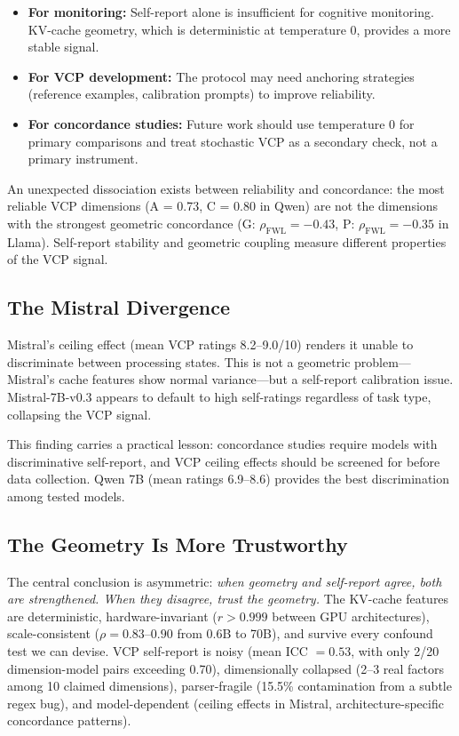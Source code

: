 \documentclass[11pt,a4paper]{article}
\begin{document}
\begin{itemize}
    \item \textbf{For monitoring:} Self-report alone is insufficient for cognitive monitoring. KV-cache geometry, which is deterministic at temperature 0, provides a more stable signal.
    \item \textbf{For VCP development:} The protocol may need anchoring strategies (reference examples, calibration prompts) to improve reliability.
    \item \textbf{For concordance studies:} Future work should use temperature 0 for primary comparisons and treat stochastic VCP as a secondary check, not a primary instrument.
\end{itemize}

An unexpected dissociation exists between reliability and concordance: the most reliable VCP dimensions (A = 0.73, C = 0.80 in Qwen) are not the dimensions with the strongest geometric concordance (G: $\rho_{\text{FWL}} = -0.43$, P: $\rho_{\text{FWL}} = -0.35$ in Llama). Self-report stability and geometric coupling measure different properties of the VCP signal.

\subsection{The Mistral Divergence}

Mistral's ceiling effect (mean VCP ratings 8.2--9.0/10) renders it unable to discriminate between processing states. This is not a geometric problem---Mistral's cache features show normal variance---but a self-report calibration issue. Mistral-7B-v0.3 appears to default to high self-ratings regardless of task type, collapsing the VCP signal.

This finding carries a practical lesson: concordance studies require models with discriminative self-report, and VCP ceiling effects should be screened for before data collection. Qwen 7B (mean ratings 6.9--8.6) provides the best discrimination among tested models.

\subsection{The Geometry Is More Trustworthy}

The central conclusion is asymmetric: \emph{when geometry and self-report agree, both are strengthened. When they disagree, trust the geometry.} The KV-cache features are deterministic, hardware-invariant ($r > 0.999$ between GPU architectures), scale-consistent ($\rho = 0.83$--$0.90$ from 0.6B to 70B), and survive every confound test we can devise. VCP self-report is noisy (mean ICC $= 0.53$, with only 2/20 dimension-model pairs exceeding 0.70), dimensionally collapsed (2--3 real factors among 10 claimed dimensions), parser-fragile (15.5\% contamination from a subtle regex bug), and model-dependent (ceiling effects in Mistral, architecture-specific concordance patterns).
\end{document}
